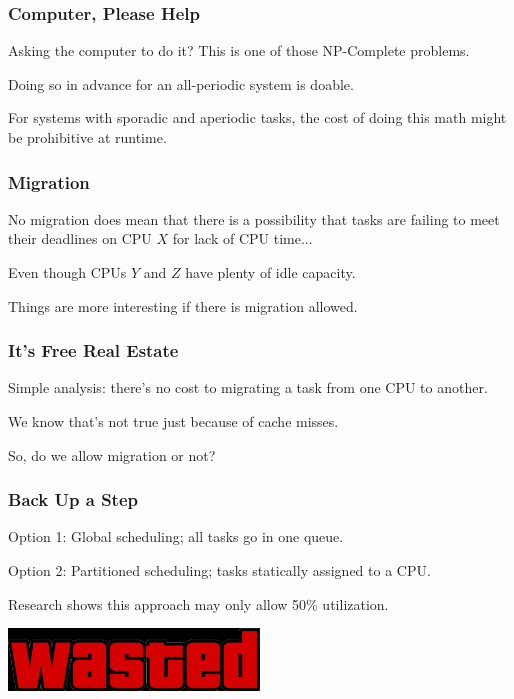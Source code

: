 \begin{frame}
\frametitle{Computer, Please Help}
Asking the computer to do it? This is one of those NP-Complete problems.

Doing so in advance for an all-periodic system is doable.

For systems with sporadic and aperiodic tasks, the cost of doing this math might be prohibitive at runtime. 

\end{frame}

\begin{frame}
\frametitle{Migration}

No migration does mean that there is a possibility that tasks are failing to meet their deadlines on CPU $X$ for lack of CPU time...

Even though CPUs $Y$ and $Z$ have plenty of idle capacity.

Things are more interesting if there is migration allowed.

\end{frame}

\begin{frame}
\frametitle{It's Free Real Estate}

Simple analysis: there's no cost to migrating a task from one CPU to another.

We know that's not true just because of cache misses.

So, do we allow migration or not?

\end{frame}


\begin{frame}
\frametitle{Back Up a Step}

Option 1: Global scheduling; all tasks go in one queue.

Option 2: \alert{Partitioned} scheduling; tasks statically assigned to a CPU.

Research shows this approach may only allow 50\% utilization.

\begin{center}
	\includegraphics[width=0.5\textwidth]{images/wasted.jpg}
\end{center}

\end{frame}


